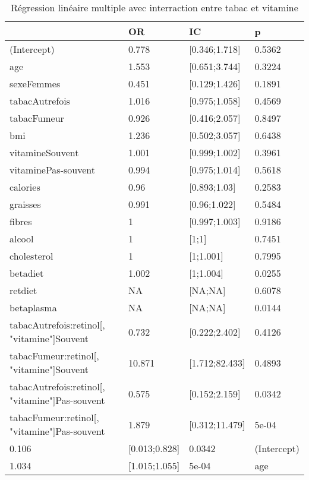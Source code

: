 \documentclass[]{article}
\begin{document}
\begin{table}

\caption{\label{tab:unnamed-chunk-85}Régression linéaire multiple avec interraction entre tabac et vitamine}
\centering
\begin{tabular}[t]{l|l|l|l}
\hline
  & OR & IC & p\\
\hline
\rowcolor[HTML]{BBD2E1}  (Intercept) & 0.778 & [0.346;1.718] & 0.5362\\
\hline
age & 1.553 & [0.651;3.744] & 0.3224\\
\hline
\rowcolor[HTML]{BBD2E1}  sexeFemmes & 0.451 & [0.129;1.426] & 0.1891\\
\hline
tabacAutrefois & 1.016 & [0.975;1.058] & 0.4569\\
\hline
\rowcolor[HTML]{BBD2E1}  tabacFumeur & 0.926 & [0.416;2.057] & 0.8497\\
\hline
bmi & 1.236 & [0.502;3.057] & 0.6438\\
\hline
\rowcolor[HTML]{BBD2E1}  vitamineSouvent & 1.001 & [0.999;1.002] & 0.3961\\
\hline
vitaminePas-souvent & 0.994 & [0.975;1.014] & 0.5618\\
\hline
\rowcolor[HTML]{BBD2E1}  calories & 0.96 & [0.893;1.03] & 0.2583\\
\hline
graisses & 0.991 & [0.96;1.022] & 0.5484\\
\hline
\rowcolor[HTML]{BBD2E1}  fibres & 1 & [0.997;1.003] & 0.9186\\
\hline
alcool & 1 & [1;1] & 0.7451\\
\hline
\rowcolor[HTML]{BBD2E1}  cholesterol & 1 & [1;1.001] & 0.7995\\
\hline
betadiet & 1.002 & [1;1.004] & 0.0255\\
\hline
\rowcolor[HTML]{BBD2E1}  retdiet & NA & [NA;NA] & 0.6078\\
\hline
betaplasma & NA & [NA;NA] & 0.0144\\
\hline
\rowcolor[HTML]{BBD2E1}  tabacAutrefois:retinol[, "vitamine"]Souvent & 0.732 & [0.222;2.402] & 0.4126\\
\hline
tabacFumeur:retinol[, "vitamine"]Souvent & 10.871 & [1.712;82.433] & 0.4893\\
\hline
\rowcolor[HTML]{BBD2E1}  tabacAutrefois:retinol[, "vitamine"]Pas-souvent & 0.575 & [0.152;2.159] & 0.0342\\
\hline
tabacFumeur:retinol[, "vitamine"]Pas-souvent & 1.879 & [0.312;11.479] & 5e-04\\
\hline
\rowcolor[HTML]{BBD2E1}  0.106 & [0.013;0.828] & 0.0342 & (Intercept)\\
\hline
1.034 & [1.015;1.055] & 5e-04 & age\\
\hline
\end{tabular}
\end{table}
\end{document}
